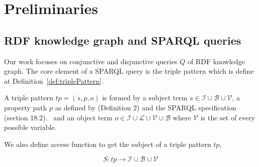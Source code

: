 \section{Preliminaries}






\subsection{RDF knowledge graph and SPARQL queries}
Our work focuses on conjunctive and disjunctive queries $Q$ of RDF knowledge graph.
The core element of a SPARQL query is the triple pattern which is define at Definition~\ref{def:triplePattern}.

\begin{definition}\label{def:triplePattern}
    A triple pattern $tp = (s, p , o)$ is formed by a subject term $s \in \mathcal{I} \cup \mathcal{B} \cup \mathcal{V}$, 
    a property path  $p$ as defined by  \citeauthor{Kostylev2015} (Definition 2) and the SPARQL specification (section 18.2).~ 
    and an object term  $o \in \mathcal{I} \cup \mathcal{L} \cup \mathcal{V} \cup \mathcal{B}$ 
    where $\mathcal{V}$ is the set of every possible variable.
\end{definition}

We also define access function to get the subject of a triple pattern $tp$, 

\begin{equation}
    S: tp \rightarrow \mathcal{I} \cup \mathcal{B} \cup \mathcal{V}
\end{equation}

